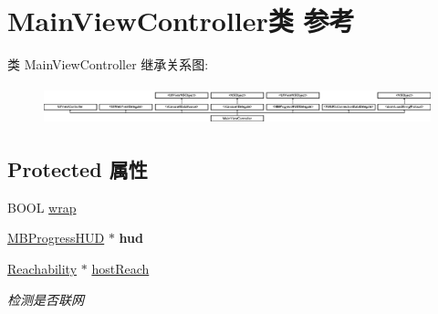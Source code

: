 \hypertarget{interface_main_view_controller}{\section{Main\-View\-Controller类 参考}
\label{interface_main_view_controller}
}
类 Main\-View\-Controller 继承关系图\-:\begin{figure}[H]
\begin{center}
\leavevmode
\includegraphics[height=1.121495cm]{interface_main_view_controller}
\end{center}
\end{figure}
\subsection*{Protected 属性}
\begin{DoxyCompactItemize}
\item 
B\-O\-O\-L \hyperlink{interface_main_view_controller_a0eb5f29f5e5e9c7228313d5fcbd606ab}{wrap}
\item 
\hypertarget{interface_main_view_controller_a4a50aa7a8400153e9ba52d0bf4cf7630}{\hyperlink{interface_m_b_progress_h_u_d}{M\-B\-Progress\-H\-U\-D} $\ast$ {\bfseries hud}}\label{interface_main_view_controller_a4a50aa7a8400153e9ba52d0bf4cf7630}

\item 
\hypertarget{interface_main_view_controller_a2fd296dcee1ae6fa7f3f346be140f6af}{\hyperlink{interface_reachability}{Reachability} $\ast$ \hyperlink{interface_main_view_controller_a2fd296dcee1ae6fa7f3f346be140f6af}{host\-Reach}}\label{interface_main_view_controller_a2fd296dcee1ae6fa7f3f346be140f6af}

\begin{DoxyCompactList}\small\item\em 检测是否联网 \end{DoxyCompactList}\end{DoxyCompactItemize}
